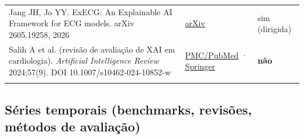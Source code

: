 \documentclass[11pt,a4paper]{article}
\begin{document}
{\begin{xltabular}{\linewidth}{>{\raggedright\arraybackslash}X>{\raggedright\arraybackslash}X>{\raggedright\arraybackslash}X}
Jang JH, Jo YY. ExECG: An Explainable AI Framework for ECG models. arXiv 2605.19258, 2026 & \href{https://arxiv.org/pdf/2605.19258}{arXiv} & sim (dirigida) \\ \addlinespace[1pt]
Salih A et al. (revisão de avaliação de XAI em cardiologia). \textit{Artificial Intelligence Review} 2024;57(9). DOI 10.1007/s10462-024-10852-w & \href{https://pmc.ncbi.nlm.nih.gov/articles/pmid/39132011}{PMC/PubMed} · \href{https://link.springer.com/article/10.1007/s10462-024-10852-w}{Springer} & \textbf{não} \\ \addlinespace[1pt]
\bottomrule
\end{xltabular}}


\subsection{Séries temporais (benchmarks, revisões, métodos de avaliação)}
\end{document}
